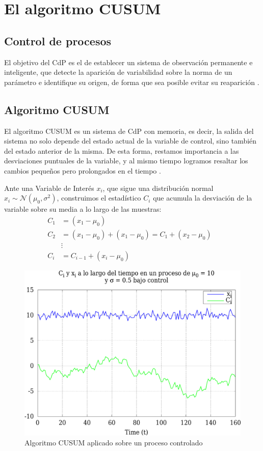 \section{El algoritmo CUSUM}\label{sec:CUSUM}

\subsection{Control de procesos}
El objetivo del \gls{CdP} es el de establecer un sistema de observación permanente e inteligente,
que detecte la aparición de variabilidad sobre la norma de un parámetro e identifique su origen, de forma que 
sea posible evitar su reaparición \cite{Control_de_procesos}.

\subsection{Algoritmo CUSUM}
El algoritmo CUSUM es un sistema de \gls{CdP} con memoria, es decir, la salida del
sistema no solo depende del estado actual de la variable de control, sino también del
estado anterior de la misma. De esta forma, restamos importancia a las desviaciones 
puntuales de la variable, y al mismo tiempo logramos resaltar los cambios pequeños
pero prolongados en el tiempo \cite{CUSUM_Carlos_III}.

Ante una Variable de Interés $x_i$, que sigue una distribución normal 
$x_i \sim\mathcal{N}\left(\mu_0,\sigma^2\right)$, 
construimos el estadístico $C_i$ que acumula la desviación de la variable sobre su media
a lo largo de las muestras:
\begin{align*}
 C_1 &= (x_1 - \mu_0) \nonumber\\
 C_2 &= (x_1 - \mu_0) + (x_1 - \mu_0) = C_1 + (x_2-\mu_0) \nonumber\\
 &\vdots& \nonumber\\
 C_i &= C_{i-1} + (x_i-\mu_0)
\end{align*}

\begin{figure}[htbp]
\includegraphics[width=\columnwidth]{CapituloCusum/Figuras/ejemploCusumControlado_crop}
\caption{Algoritmo CUSUM aplicado sobre un proceso controlado}
\label{fig:cusum_controlado} 
\end{figure}

